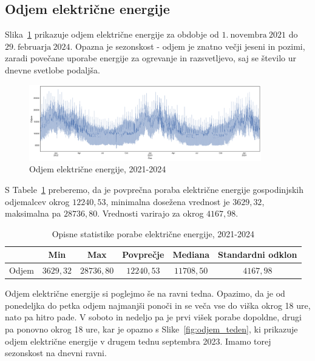 \documentclass[a4paper, 11pt]{article}
\begin{document}
\subsection{Odjem električne energije}

\noindent Slika~\ref{fig:odjem_EE} prikazuje odjem električne energije za obdobje od 
$1.~\text{novembra}~2021$ do $29.~\text{februarja}~2024$. 
Opazna je sezonskost - odjem je znatno večji jeseni in pozimi, zaradi povečane uporabe energije za ogrevanje in 
razsvetljevo, saj se število ur dnevne svetlobe podaljša. \\

\begin{figure}[h!]
    \centering
    \caption{Odjem električne energije, 2021-2024}\par\medskip
    \label{fig:odjem_EE}
    \includegraphics[width=0.9\textwidth]{odjem_EE.png}
\end{figure}

\noindent S Tabele~\ref{Tab:opisne_statistike} preberemo, da je povprečna poraba električne energije gospodinjskih odjemalcev
okrog $12240{,}53 $, minimalna dosežena vrednost je $3629{,}32$, maksimalna pa $28736{,}80$. Vrednosti varirajo
za okrog $4167{,}98$. \\

\begin{table}[!h]
    \centering
    \caption{Opisne statistike porabe električne energije, 2021-2024}\par\medskip
    \label{Tab:opisne_statistike}
    \begin{tabular}{c||c|c|c|c|c}
              & Min & Max & Povprečje & Mediana & Standardni odklon \\ \hline \hline
        Odjem & $3629{,}32$ & $28736{,}80$ & $12240{,}53$ & $11708{,}50$ & $4167{,}98$ \\ 
    \end{tabular}
\end{table}

\noindent Odjem električne energije si poglejmo še na ravni tedna. Opazimo, da 
je od ponedeljka do petka odjem najmanjši ponoči in se veča vse do viška okrog 18 ure, nato pa hitro pade. 
V soboto in nedeljo pa je prvi višek porabe dopoldne, drugi pa ponovno okrog 18 ure, kar je opazno s Slike~\ref{fig:odjem_teden}, 
ki prikazuje odjem 
električne energije v drugem tednu septembra 2023. 
Imamo torej sezonskost na dnevni ravni.
\end{document}
